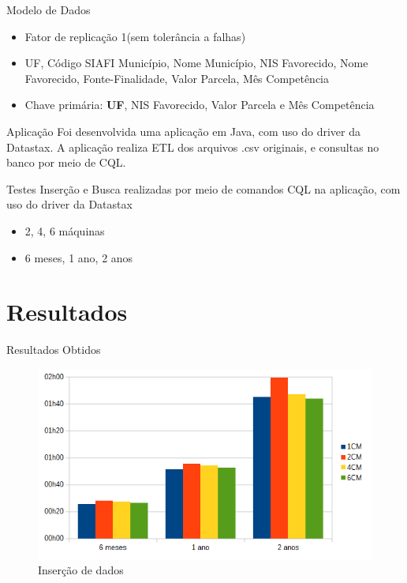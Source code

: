 \begin{frame}{Modelo de Dados}
	\begin{itemize}
		\item Fator de replicação 1(sem tolerância a falhas)
		\item UF, Código SIAFI Município, Nome Município, NIS Favorecido, Nome Favorecido, Fonte-Finalidade,
		Valor Parcela, Mês Competência
		\item Chave primária: \textbf{UF}, NIS Favorecido,
		Valor Parcela e Mês Competência
	\end{itemize}
	
\end{frame}

\begin{frame}{Aplicação}
	Foi desenvolvida uma aplicação em Java, com uso do driver da Datastax.
	A aplicação realiza ETL dos arquivos .csv originais, e consultas no banco por meio de CQL.
\end{frame}

\begin{frame}{Testes}
	Inserção e Busca realizadas por meio de comandos CQL na aplicação, com uso do driver da Datastax
	\begin{itemize}
		\item 2, 4, 6 máquinas
		\item 6 meses, 1 ano, 2 anos
	\end{itemize}
\end{frame}

\section{Resultados}

\begin{frame}{Resultados Obtidos}

\begin{figure}[!htb]
	\centering
	\includegraphics[width=1\textwidth]{../figuras/graphinsert.png}
	\caption{Inserção de dados}
	\label{fig:graphinsert}
\end{figure}
  
\end{frame}

